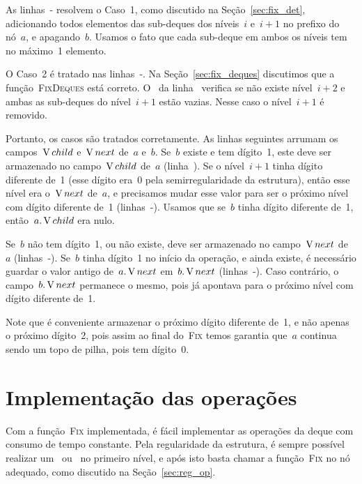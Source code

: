 \documentclass[main.tex]{subfiles}
\begin{document}
As linhas~{-} resolvem o Caso~1, como discutido na Seção~\ref{sec:fix_det}, adicionando todos elementos das sub-deques dos níveis~$i$ e~$i+1$ no prefixo do nó~$a$, e apagando~$b$. Usamos o fato que cada sub-deque em ambos os níveis tem no máximo~1 elemento.

O Caso~2 é tratado nas linhas~{-}. Na Seção~\ref{sec:fix_deques} discutimos que a função~\textsc{FixDeques} está correto. O~ da linha~ verifica se não existe nível~$i+2$ e ambas as sub-deques do nível~$i+1$ estão vazias. Nesse caso o nível~$i+1$ é removido.

Portanto, os casos são tratados corretamente. As linhas seguintes arrumam os campos~$\operatorname{V}{child}$ e~$\operatorname{V}{next}$ de~$a$ e~$b$. Se~$b$ existe e tem dígito~1, este deve ser armazenado no campo~$\operatorname{V}{child}$ de~$a$ (linha~). Se o nível~$i+1$ tinha dígito diferente de~1 (esse dígito era~0 pela semirregularidade da estrutura), então esse nível era o~$\operatorname{V}{next}$ de~$a$, e precisamos mudar esse valor para ser o próximo nível com dígito diferente de~1 (linhas~-). Usamos que se~$b$ tinha dígito diferente de~1, então~$a.\operatorname{V}{child}$ era nulo.

Se~$b$ não tem dígito~1, ou não existe, deve ser armazenado no campo~$\operatorname{V}{next}$ de~$a$ (linhas~-).
Se~$b$ tinha dígito~1 no início da operação, e ainda existe, é necessário guardar o valor antigo de~$a.\operatorname{V}{next}$ em~$b.\operatorname{V}{next}$ (linhas~-). Caso contrário, o campo~$b.\operatorname{V}{next}$ permanece o mesmo, pois já apontava para o próximo nível com dígito diferente de~1.

Note que é conveniente armazenar o próximo dígito diferente de~1, e não apenas o próximo dígito~2, pois assim ao final do~\textsc{Fix} temos garantia que~$a$ continua sendo um topo de pilha, pois tem dígito~0.

\section{Implementação das operações}

Com a função~\textsc{Fix} implementada, é fácil implementar as operações da deque com consumo de tempo constante. Pela regularidade da estrutura, é sempre possível realizar um~ ou~ no primeiro nível, e após isto basta chamar a função~\textsc{Fix} no nó adequado, como discutido na Seção~\ref{sec:reg_op}.
\end{document}
